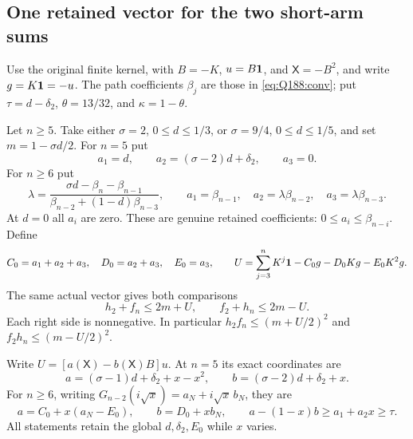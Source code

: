 \subsection{One retained vector for the two short-arm sums}
\label{sec:unit-retained-square}
Use the original finite kernel, with $B=-K$, $u=B\mathbf1$, and
$\mathsf X=-B^2$, and write $g=K\mathbf1=-u$. The path coefficients $\beta_j$ are those in
\eqref{eq:Q188:conv}; put $\tau=d-\delta_2$, $\theta=13/32$,
and $\kappa=1-\theta$.

\begin{lemma}
\label{lem:unit-retained-pair}
Let $n\ge5$. Take either $\sigma=2$, $0\le d\le1/3$, or
$\sigma=9/4$, $0\le d\le1/5$, and set $m=1-\sigma d/2$.
For $n=5$ put
\[
 a_1=d,\qquad a_2=(\sigma-2)d+\delta_2,\qquad a_3=0.
\]
For $n\ge6$ put
\[
 \lambda=\frac{\sigma d-\beta_n-\beta_{n-1}}
                    {\beta_{n-2}+(1-d)\beta_{n-3}},\qquad
 a_1=\beta_{n-1},\quad a_2=\lambda\beta_{n-2},\quad
 a_3=\lambda\beta_{n-3}.
\]
At $d=0$ all $a_i$ are zero. These are genuine retained coefficients:
$0\le a_i\le\beta_{n-i}$. Define
\[
 C_0=a_1+a_2+a_3,\quad D_0=a_2+a_3,\quad E_0=a_3,\qquad
 U=\sum_{j=3}^{n}K^j\mathbf1-C_0g-D_0Kg-E_0K^2g.
\]
The same actual vector gives both comparisons
\begin{equation}\label{eq:unit-retained:dual-sums}
 h_2+f_n\le2m+U,\qquad f_2+h_n\le2m-U.
\end{equation}
Each right side is nonnegative. In particular
$h_2f_n\le(m+U/2)^2$ and $f_2h_n\le(m-U/2)^2$.

Write $U=[a(\mathsf X)-b(\mathsf X)B]u$. At $n=5$ its exact
coordinates are
\[
 a=(\sigma-1)d+\delta_2+x-x^2,\qquad
 b=(\sigma-2)d+\delta_2+x.
\]
For $n\ge6$, writing $G_{n-2}(i\sqrt x)=a_N+i\sqrt x\,b_N$,
they are
\begin{equation}\label{eq:unit-retained:coordinates}
 a=C_0+x(a_N-E_0),\qquad b=D_0+xb_N,
 \qquad a-(1-x)b\ge a_1+a_2x\ge\tau.
\end{equation}
All statements retain the global $d,\delta_2,E_0$ while $x$ varies.
\end{lemma}
